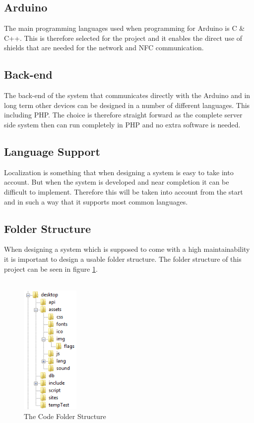 \subsection*{Arduino}
\label{sec:arduino} %
The main programming languages used when programming for Arduino is C \& C++. This is therefore selected for the project and it enables the direct use of shields that are needed for the network and NFC communication. 

\subsection*{Back-end}
\label{sec:backend} 
The back-end of the system that communicates directly with the Arduino and in long term other devices can be designed in a number of different languages. This including PHP. The choice is therefore straight forward as the complete server side system then can run completely in PHP and no extra software is needed.

\subsection*{Language Support}
\label{sec:langSupport}
Localization is something that when designing a system is easy to take into account. But when the system is developed and near completion it can be difficult to implement. Therefore this will be taken into account from the start and in such a way that it supports most common languages.

\subsection*{Folder Structure}
\label{sec:folderStructure}
When designing a system which is supposed to come with a high maintainability it is important to design a usable folder structure. The folder structure of this project can be seen in figure \ref{fig:folderStructure}.\\
\\

\begin{figure}[htbp]
        \centering
                \includegraphics[width=0.25\textwidth]{images/folderStructure.png}
        \caption{The Code Folder Structure}
        \label{fig:folderStructure}
\end{figure}

